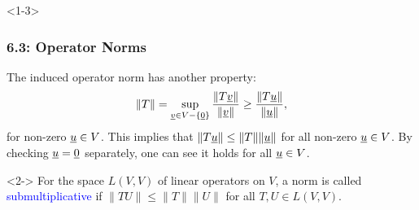 \documentclass[10pt,english,aspectratio=169]{beamer}
\begin{document}
\begin{frame}<1-3> \frametitle{6.3: Operator Norms}



The induced operator norm has another property:
\[ \| T \| = \sup_{ \underline{v} \in V - \left\{ \underline{0} \right\} }
\frac{ \left\| T \underline{v} \right\| }{ \left\| \underline{v} \right\| } \geq \frac{ \left\| T \underline{u} \right\| }{ \left\| \underline{u} \right\| }, \]
for non-zero $\underline{u} \in V$.
This implies that $\| T \underline{u} \| \leq \| T \| \| \underline{u} \|$ for all non-zero $\underline{u}\in V$.
By checking $\underline{u}=\underline{0}$ separately, one can see it holds for all $\underline{u}\in V$.
\vspace{3mm}

\begin{definition}<2->
For the space $L(V,V)$ of linear operators on $V$, a norm is called \textcolor{blue}{submultiplicative} if $\| T U \| \leq \|T\| \|U\|$ for all $T,U \in L(V,V)$.
\end{definition}

\vspace{4mm}



\end{frame}
\end{document}
